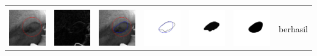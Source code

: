 \begin{table}[H]
\begin{tabular}{|m{0.7in}|m{0.7in}|m{0.7in}|m{0.7in}|m{0.7in}|m{0.7in}|m{0.7in}|}
		&  &  & & & &  \\
		\includegraphics[width=0.7in]{dataset/dataset_3/luka_merah/ready/25_interp_init.jpg}&
		\includegraphics[width=0.7in]{dataset/dataset_3/luka_merah/ready/25_interp_ext.jpg}&
		\includegraphics[width=0.7in]{dataset/dataset_3/luka_merah/ready/25_interp_result.jpg}&
		\includegraphics[width=0.7in]{dataset/dataset_3/luka_merah/ready/25_gt_r.jpg}&
		\includegraphics[width=0.7in]{dataset/dataset_3/luka_merah/ready/25_r.jpg}&
		\includegraphics[width=0.7in]{dataset/dataset_3/luka_merah/ready/25_interp_r.jpg}&
		berhasil\\
		\hline
		

\end{tabular}
\end{table}
